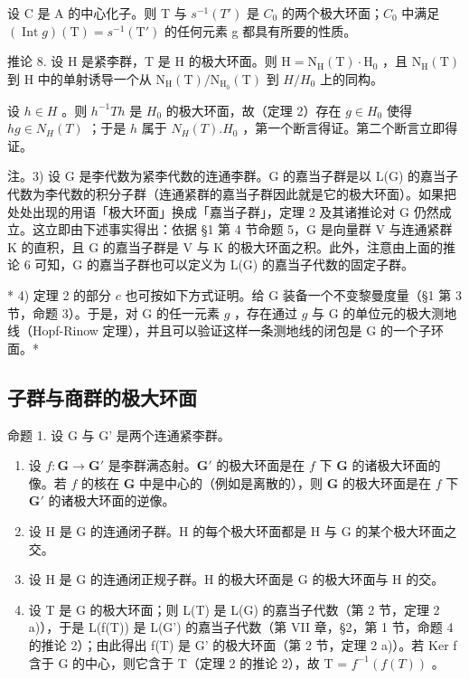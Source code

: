 设 C 是 A 的中心化子。则 T 与 \(s^{-1}(T')\) 是 \(C_{0}\) 的两个极大环面；\(C_{0}\) 中满足 \((\operatorname{Int} g)(\mathrm{T}) = s^{-1}(\mathrm{T}')\) 的任何元素 g 都具有所要的性质。

推论 8. 设 H 是紧李群，T 是 H 的极大环面。则 \(\mathrm{H} = \mathrm{N}_{\mathrm{H}}(\mathrm{T}) \cdot \mathrm{H}_{0}\) ，且 \(\mathrm{N}_{\mathrm{H}}(\mathrm{T})\) 到 H 中的单射诱导一个从 \(\mathrm{N}_{\mathrm{H}}(\mathrm{T}) / \mathrm{N}_{\mathrm{H}_{0}}(\mathrm{T})\) 到 \(H/H_{0}\) 上的同构。

设 \(h \in H\) 。则 \(h^{-1}Th\) 是 \(H_0\) 的极大环面，故（定理 2）存在 \(g \in H_0\) 使得 \(hg \in N_H(T)\) ；于是 \(h\) 属于 \(N_H(T).H_0\) ，第一个断言得证。第二个断言立即得证。

注。3) 设 G 是李代数为紧李代数的连通李群。G 的嘉当子群是以 L(G) 的嘉当子代数为李代数的积分子群（连通紧群的嘉当子群因此就是它的极大环面）。如果把处处出现的用语「极大环面」换成「嘉当子群」，定理 2 及其诸推论对 G 仍然成立。这立即由下述事实得出：依据 §1 第 4 节命题 5，G 是向量群 V 与连通紧群 K 的直积，且 G 的嘉当子群是 V 与 K 的极大环面之积。此外，注意由上面的推论 6 可知，G 的嘉当子群也可以定义为 L(G) 的嘉当子代数的固定子群。

* 4) 定理 2 的部分 \(c\) 也可按如下方式证明。给 G 装备一个不变黎曼度量（§1 第 3 节，命题 3）。于是，对 G 的任一元素 \(g\) ，存在通过 \(g\) 与 G 的单位元的极大测地线（Hopf-Rinow 定理），并且可以验证这样一条测地线的闭包是 G 的一个子环面。*

\subsection{子群与商群的极大环面}

命题 1. 设 G 与 G' 是两个连通紧李群。

\begin{enumerate}
\def\labelenumi{\alph{enumi})}
\item
  设 \(f: \mathbf{G} \to \mathbf{G}'\) 是李群满态射。\(\mathbf{G}'\) 的极大环面是在 \(f\) 下 \(\mathbf{G}\) 的诸极大环面的像。若 \(f\) 的核在 \(\mathbf{G}\) 中是中心的（例如是离散的），则 \(\mathbf{G}\) 的极大环面是在 \(f\) 下 \(\mathbf{G}'\) 的诸极大环面的逆像。
\item
  设 \(\mathrm{H}\) 是 \(\mathrm{G}\) 的连通闭子群。\(\mathrm{H}\) 的每个极大环面都是 \(\mathrm{H}\) 与 \(\mathrm{G}\) 的某个极大环面之交。
\item
  设 H 是 G 的连通闭正规子群。H 的极大环面是 G 的极大环面与 H 的交。
\item
  设 T 是 G 的极大环面；则 L(T) 是 L(G) 的嘉当子代数（第 2 节，定理 2 a)），于是 L(f(T)) 是 L(G') 的嘉当子代数（第 VII 章，§2，第 1 节，命题 4 的推论 2）；由此得出 f(T) 是 G' 的极大环面（第 2 节，定理 2 a)）。若 Ker f 含于 G 的中心，则它含于 T（定理 2 的推论 2），故 T = \(f^{-1}(f(T))\) 。
\end{enumerate}

